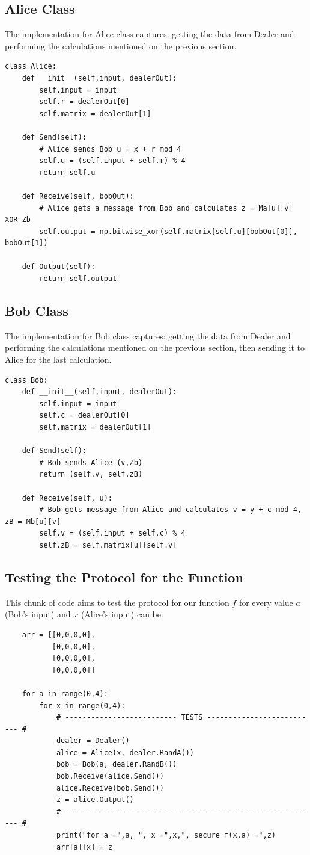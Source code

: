\documentclass{article}
\begin{document}
\subsection{Alice Class}
The implementation for Alice class captures: getting the data from Dealer and performing the calculations mentioned on the previous section.
\begin{lstlisting}
class Alice:
    def __init__(self,input, dealerOut):
        self.input = input
        self.r = dealerOut[0]
        self.matrix = dealerOut[1]
        
    def Send(self):
        # Alice sends Bob u = x + r mod 4
        self.u = (self.input + self.r) % 4
        return self.u
        
    def Receive(self, bobOut):
        # Alice gets a message from Bob and calculates z = Ma[u][v] XOR Zb
        self.output = np.bitwise_xor(self.matrix[self.u][bobOut[0]], bobOut[1])
        
    def Output(self):
        return self.output
\end{lstlisting}

\subsection{Bob Class}
The implementation for Bob class captures: getting the data from Dealer and performing the calculations mentioned on the previous section, then sending it to Alice for the last calculation.
\begin{lstlisting}
class Bob:
    def __init__(self,input, dealerOut):
        self.input = input
        self.c = dealerOut[0]
        self.matrix = dealerOut[1]
        
    def Send(self):
        # Bob sends Alice (v,Zb)
        return (self.v, self.zB)
        
    def Receive(self, u):
        # Bob gets message from Alice and calculates v = y + c mod 4, zB = Mb[u][v]
        self.v = (self.input + self.c) % 4
        self.zB = self.matrix[u][self.v]
\end{lstlisting}

\subsection{Testing the Protocol for the Function}
This chunk of code aims to test the protocol for our function $f$ for every value $a$ (Bob's input) and $x$ (Alice's input) can be.
\begin{lstlisting}
    arr = [[0,0,0,0],
           [0,0,0,0],
           [0,0,0,0],
           [0,0,0,0]]
    
    for a in range(0,4):
        for x in range(0,4):
            # -------------------------- TESTS -------------------------- #
            dealer = Dealer()
            alice = Alice(x, dealer.RandA())
            bob = Bob(a, dealer.RandB())
            bob.Receive(alice.Send())
            alice.Receive(bob.Send())
            z = alice.Output()
            # ----------------------------------------------------------- #
            print("for a =",a, ", x =",x,", secure f(x,a) =",z)
            arr[a][x] = z
\end{lstlisting}
\end{document}
